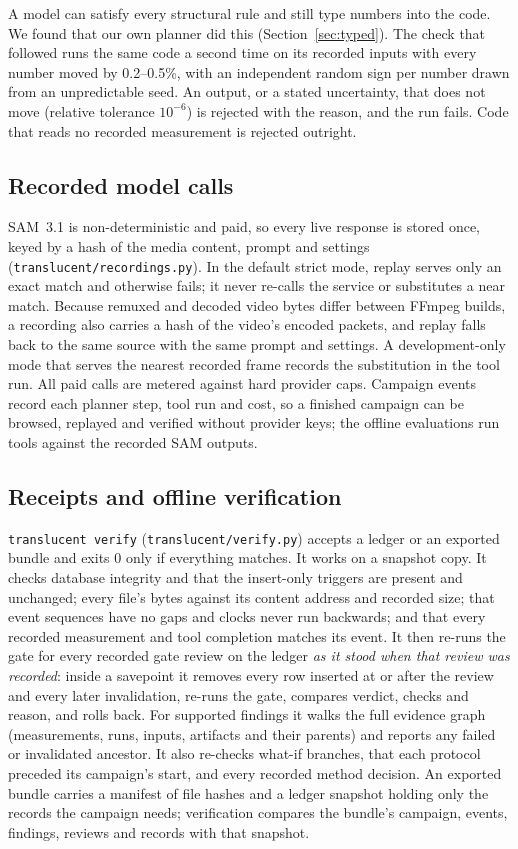 \documentclass[11pt]{article}
\newcommand{\cmd}[1]{\texttt{#1}}
\begin{document}
A model can satisfy every structural rule and still type numbers into the code. We found that our own planner did
this (Section~\ref{sec:typed}). The check that followed runs the same code a second time on its recorded inputs with
every number moved by 0.2--0.5\%, with an independent random sign per number drawn from an unpredictable seed. An
output, or a stated uncertainty, that does not move (relative tolerance $10^{-6}$) is rejected with the reason, and
the run fails. Code that reads no recorded measurement is rejected outright.

\subsection{Recorded model calls}
SAM~3.1 is non-deterministic and paid, so every live response is stored once, keyed by a hash of the media content,
prompt and settings (\cmd{translucent/recordings.py}). In the default strict mode, replay serves only an exact match
and otherwise fails; it never re-calls the service or substitutes a near match. Because remuxed and decoded video
bytes differ between FFmpeg builds, a recording also carries a hash of the video's encoded packets, and replay falls
back to the same source with the same prompt and settings. A development-only mode that serves the nearest recorded
frame records the substitution in the tool run. All paid calls are metered against hard provider caps. Campaign
events record each planner step, tool run and cost, so a finished campaign can be browsed, replayed and verified
without provider keys; the offline evaluations run tools against the recorded SAM outputs.

\subsection{Receipts and offline verification}
\cmd{translucent verify} (\cmd{translucent/verify.py}) accepts a ledger or an exported bundle and exits 0 only if
everything matches. It works on a snapshot copy. It checks database integrity and that the insert-only triggers are
present and unchanged; every file's bytes against its content address and recorded size; that event sequences have no
gaps and clocks never run backwards; and that every recorded measurement and tool completion matches its event. It
then re-runs the gate for every recorded gate review on the ledger \emph{as it stood when that review was recorded}:
inside a savepoint it removes every row inserted at or after the review and every later invalidation, re-runs the
gate, compares verdict, checks and reason, and rolls back. For supported findings it walks the full evidence graph
(measurements, runs, inputs, artifacts and their parents) and reports any failed or invalidated ancestor. It also
re-checks what-if branches, that each protocol preceded its campaign's start, and every recorded method decision.
An exported bundle carries a manifest of file hashes and a ledger snapshot holding only the records the campaign
needs; verification compares the bundle's campaign, events, findings, reviews and records with that snapshot.
\end{document}
